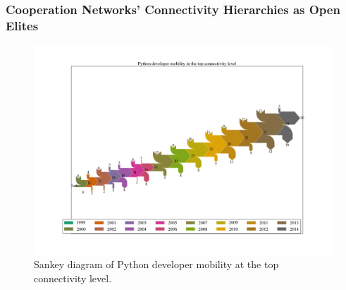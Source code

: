 \documentclass[ignorenonframetext,red,8pt,notes=hide]{beamer}
\begin{document}
\begin{frame}
\frametitle{Cooperation Networks' Connectivity Hierarchies as Open Elites}

\begin{figure}
\centering
\vspace{-0.2cm}
\hspace{-0.8cm}
\includegraphics[scale=0.22]{../../figures/sankey_mobility_python_years}
\caption{Sankey diagram of Python developer mobility at the top connectivity level.}
\end{figure}

\end{frame}
\end{document}
